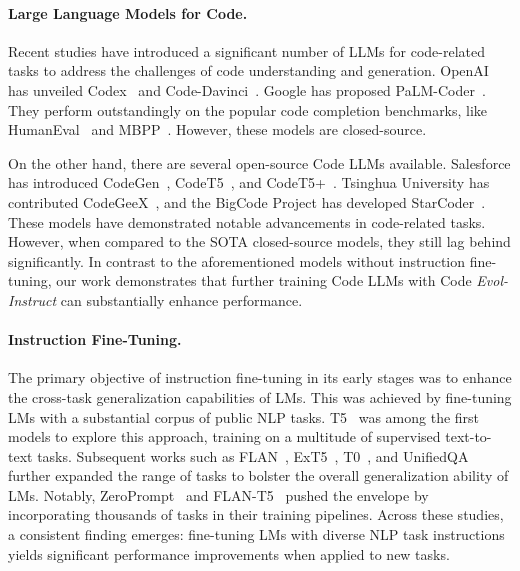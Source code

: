 \documentclass{article}
\newcommand{\name}{\emph{Evol-Instruct}}
\begin{document}
\paragraph{Large Language Models for Code.} Recent studies have introduced a significant number of LLMs for code-related tasks to address the challenges of code understanding and generation. OpenAI has unveiled Codex~\cite{codex} and Code-Davinci~\cite{Azure}. Google has proposed PaLM-Coder~\cite{PaLM}. They perform outstandingly on the popular code completion benchmarks, like HumanEval~\cite{humeval} and MBPP~\cite{MBPP}. However, these models are closed-source. 

On the other hand, there are several open-source Code LLMs available. Salesforce has introduced CodeGen~\cite{codegen}, CodeT5~\cite{codet5}, and CodeT5+~\cite{CodeT5+}. Tsinghua University has contributed CodeGeeX~\cite{CodeGeeX}, and the BigCode Project has developed StarCoder~\cite{li2023starcoder}. These models have demonstrated notable advancements in code-related tasks. However, when compared to the SOTA closed-source models, they still lag behind significantly. In contrast to the aforementioned models without instruction fine-tuning, our work demonstrates that further training Code LLMs with Code \name{} can substantially enhance performance.

\paragraph{Instruction Fine-Tuning.} 

The primary objective of instruction fine-tuning in its early stages was to enhance the cross-task generalization capabilities of LMs. This was achieved by fine-tuning LMs with a substantial corpus of public NLP tasks. T5~\cite{t5} was among the first models to explore this approach, training on a multitude of supervised text-to-text tasks. Subsequent works such as FLAN~\cite{DBLP:conf/iclr/WeiBZGYLDDL22}, ExT5~\cite{ExT5}, T0~\cite{T0}, and UnifiedQA~\cite{UnifiedQA} further expanded the range of tasks to bolster the overall generalization ability of LMs. Notably, ZeroPrompt~\cite{ZeroPrompt} and FLAN-T5~\cite{flan-t5} pushed the envelope by incorporating thousands of tasks in their training pipelines. Across these studies, a consistent finding emerges: fine-tuning LMs with diverse NLP task instructions yields significant performance improvements when applied to new tasks.
\end{document}
